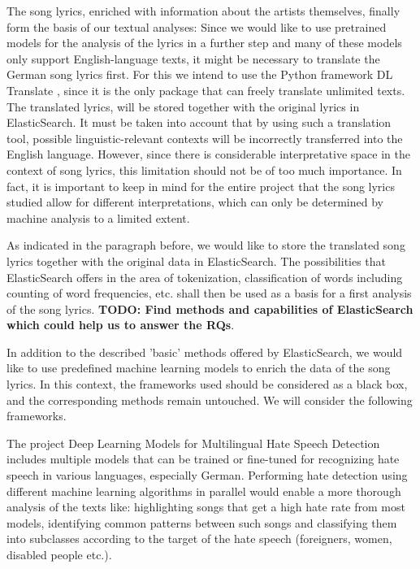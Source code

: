 The song lyrics, enriched with information about the artists themselves, finally form the basis of our textual analyses: Since we would like to use pretrained models for the analysis of the lyrics in a further step and many of these models only support English-language texts, it might be necessary to translate the German song lyrics first. For this we intend to use the Python framework DL Translate \cite{lu_2022}, since it is the only package that can freely translate unlimited texts. The translated lyrics, will be stored together with the original lyrics in ElasticSearch. It must be taken into account that by using such a translation tool, possible linguistic-relevant contexts will be incorrectly transferred into the English language. However, since there is considerable interpretative space in the context of song lyrics, this limitation should not be of too much importance. In fact, it is important to keep in mind for the entire project that the song lyrics studied allow for different interpretations, which can only be determined by machine analysis to a limited extent.

As indicated in the paragraph before, we would like to store the translated song lyrics together with the original data in ElasticSearch. The possibilities that ElasticSearch offers in the area of tokenization, classification of words including counting of word frequencies, etc. shall then be used as a basis for a first analysis of the song lyrics.
\textbf{TODO: Find methods and capabilities of ElasticSearch which could help us to answer the RQs}.

In addition to the described 'basic' methods offered by ElasticSearch, we would like to use predefined machine learning models to enrich the data of the song lyrics. In this context, the frameworks used should be considered as a black box, and the corresponding methods remain untouched. We will consider the following frameworks.

The project Deep Learning Models for Multilingual Hate Speech Detection \cite{deepMLhatespeech} includes multiple models that can be trained or fine-tuned for recognizing hate speech in various languages, especially German. Performing hate detection using different machine learning algorithms in parallel would enable a more thorough analysis of the texts like: highlighting songs that get a high hate rate from most models, identifying common patterns between such songs and classifying them into subclasses according to the target of the hate speech (foreigners, women, disabled people etc.).


